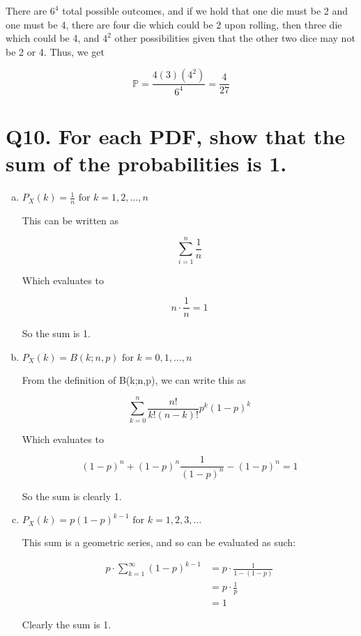 \documentclass{article}
\begin{document}
There are $6^4$ total possible outcomes, and if we hold that one die must be 2 and one must be 4, there are four die which could be 2 upon rolling, then three die which could be 4, and $4^2$ other possibilities given that the other two dice may not be 2 or 4. Thus, we get

$$\mathbb{P} = \frac{4(3)(4^2)}{6^4} = \frac{4}{27}$$





\section*{Q10. \normalsize For each PDF, show that the sum of the probabilities is 1.}

\begin{enumerate}[(a)]
  \item $P_X(k) = \frac{1}{n} \text{ for } k = 1,2,\dots,n$

    This can be written as
    
    $$\sum_{i=1}^n \frac{1}{n}$$

    Which evaluates to 

    $$n\cdot\frac{1}{n} = 1$$

    So the sum is 1.
  \item $P_X(k) = B(k;n,p) \text{ for } k = 0,1,\dots,n$

    From the definition of B(k;n,p), we can write this as

    $$\sum_{k=0}^n \frac{n!}{k!(n-k)!}p^k(1-p)^k$$

    Which evaluates to 

    $$(1-p)^n + (1-p)^n\frac{1}{(1-p)^n} - (1-p)^n = 1$$

    So the sum is clearly 1.
  \item $P_X(k) = p(1-p)^{k-1} \text{ for } k = 1,2,3,\dots$

    This sum is a geometric series, and so can be evaluated as such:

    \begin{align*}
      p\cdot \sum_{k=1}^{\infty} (1-p)^{k-1} &= p\cdot\frac{1}{1-(1-p)} \\
      &= p\cdot\frac{1}{p} \\
      &= 1
    \end{align*}

    Clearly the sum is 1.
\end{enumerate}
\end{document}
